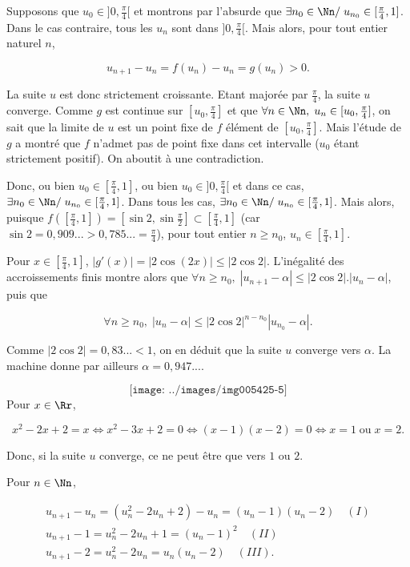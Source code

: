 {{Supposons que $u_0\in]0,\frac{\pi}{4}[$ et montrons par l'absurde que $\exists n_0\in\Nn/\;u_{n_0}\in[\frac{\pi}{4},1]$. Dans le cas contraire, tous les $u_n$ sont dans $]0,\frac{\pi}{4}[$. Mais alors, pour tout entier naturel $n$,

$$u_{n+1}-u_n=f(u_n)-u_n=g(u_n)>0.$$

La suite $u$ est donc strictement croissante. Etant majorée par $\frac{\pi}{4}$, la suite $u$ converge. Comme $g$ est continue sur $[u_0,\frac{\pi}{4}]$ et que $\forall n\in\Nn,\;u_n\in[u_0,\frac{\pi}{4}]$, on sait que la limite de $u$ est un point fixe de $f$ élément de $[u_0,\frac{\pi}{4}]$. Mais l'étude de $g$ a montré que $f$ n'admet pas de point fixe dans cet intervalle ($u_0$ étant strictement positif). On aboutit à une contradiction.

Donc, ou bien $u_0\in[\frac{\pi}{4},1]$, ou bien $u_0\in]0,\frac{\pi}{4}[$ et dans ce cas, $\exists n_0\in\Nn/\;u_{n_0}\in[\frac{\pi}{4},1]$. Dans tous les cas, $\exists n_0\in\Nn/\;u_{n_0}\in[\frac{\pi}{4},1]$. Mais alors, puisque $f([\frac{\pi}{4},1])=[\sin2,\sin\frac{\pi}{2}]\subset[\frac{\pi}{4},1]$ (car $\sin2=0,909...>0,785...=\frac{\pi}{4}$), pour tout entier $n\geq n_0$, $u_n\in[\frac{\pi}{4},1]$.

Pour $x\in[\frac{\pi}{4},1]$, $|g'(x)|=|2\cos(2x)|\leq|2\cos2|$. L'inégalité des accroissements finis montre alors que $\forall n\geq n_0,\;|u_{n+1}-\alpha|\leq|2\cos2|.|u_n-\alpha|$, puis que 

$$\forall n\geq n_0,\;|u_n-\alpha|\leq|2\cos2|^{n-n_0}|u_{n_0}-\alpha|.$$

Comme $|2\cos2|=0,83...<1$, on en déduit que la suite $u$ converge vers $\alpha$. La machine donne par ailleurs $\alpha=0,947...$.

$$\texttt{[image: ../images/img005425-5]}$$
Pour $x\in\Rr$,

$$x^2-2x+2=x\Leftrightarrow x^2-3x+2=0\Leftrightarrow(x-1)(x-2)=0\Leftrightarrow x=1\;\mbox{ou}\;x=2.$$

Donc, si la suite $u$ converge, ce ne peut être que vers $1$ ou $2$.

Pour $n\in\Nn$,

$$\begin{array}{l}
u_{n+1}-u_n=(u_n^2-2u_n+2)-u_n=(u_n-1)(u_n-2)\quad(I)\\
u_{n+1}-1=u_n^2-2u_n+1=(u_n-1)^2\quad(II)\\
u_{n+1}-2=u_n^2-2u_n=u_n(u_n-2)\quad(III).
\end{array}
$$

}}
